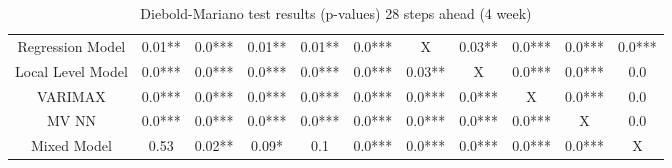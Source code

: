 \begin{landscape}
\begin{table}[]
\begin{tabular}{|c|c c c c c c c c c c|}
        Regression Model & 0.01** & 0.0*** & 0.01** & 0.01** & 0.0*** & X & 0.03** & 0.0*** & 0.0*** & 0.0***\\
        Local Level Model & 0.0*** & 0.0*** & 0.0*** & 0.0*** & 0.0*** & 0.03** & X & 0.0*** & 0.0*** & 0.0\\
        VARIMAX & 0.0*** & 0.0*** & 0.0*** & 0.0*** & 0.0*** & 0.0*** & 0.0*** & X & 0.0*** & 0.0\\
        MV NN & 0.0*** & 0.0*** & 0.0*** & 0.0*** & 0.0*** & 0.0*** & 0.0*** & 0.0*** & X & 0.0\\
        Mixed Model & 0.53 & 0.02** & 0.09* & 0.1 & 0.0*** & 0.0*** & 0.0*** & 0.0*** & 0.0*** & X\\
    \hline
    \end{tabular}
    \caption{Diebold-Mariano test results (p-values) 28 steps ahead (4 week)}
    \label{tab:4 week ahead dm}
\end{table}
\end{landscape}

